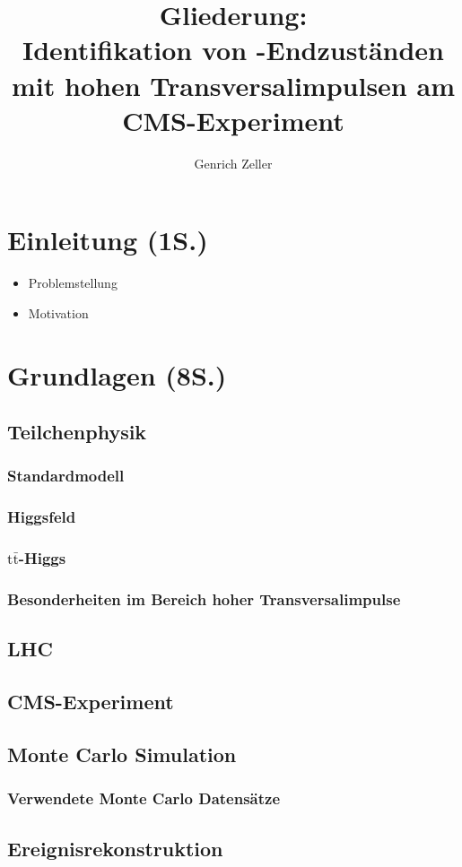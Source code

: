 \documentclass[12pt,a4paper]{article}
\title{Gliederung:\\\textbf{Identifikation von \tth -Endzuständen mit hohen Transversalimpulsen am CMS-Experiment}}
\author{Genrich Zeller}
\newcommand{\ttbar}{$\text{t} \bar{ \text{t}}$}
\begin{document}
\maketitle
\tableofcontents
\newpage
\section{Einleitung (1S.)}
\begin{itemize}
\item Problemstellung
\item Motivation
\end{itemize}
\section{Grundlagen (8S.)}
\subsection{Teilchenphysik}
\subsubsection{Standardmodell}
\subsubsection{Higgsfeld}
\subsubsection{\ttbar -Higgs}
\subsubsection{Besonderheiten im Bereich hoher Transversalimpulse}
\subsection{LHC}
\subsection{CMS-Experiment}
\subsection{Monte Carlo Simulation}
\subsubsection{Verwendete Monte Carlo Datensätze}
\subsection{Ereignisrekonstruktion}
\end{document}
